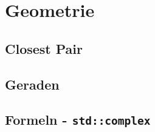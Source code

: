 \section{Geometrie}

\subsection{Closest Pair}


\subsection{Geraden}


\subsection{Formeln - \lstinline{std::complex}}
